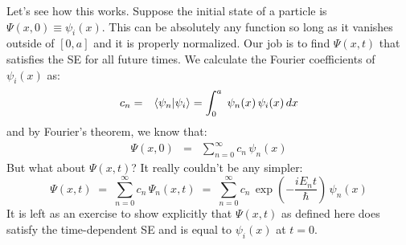 \documentclass[12pt]{book}
\begin{document}
Let's see how this works.  Suppose the initial state of a particle is $\Psi(x,0) \equiv \psi_i(x)$.  This can be absolutely any function so long as it vanishes outside of $[0,a]$ and it is properly normalized.  Our job is to find $\Psi(x,t)$ that satisfies the SE for all future times.  We calculate the Fourier coefficients of $\psi_i(x)$ as:
\begin{eqnarray*}
c_n &=& \braket{\psi_n| \psi_i} = \int_{0}^{a} \; \psi_n(x) \, \psi_i(x) \, dx \\
\end{eqnarray*}
and by Fourier's theorem, we know that:
\begin{eqnarray*}
\Psi(x,0) &=& \sum_{n=0}^{\infty} c_n \, \psi_n(x)
\end{eqnarray*}
But what about $\Psi(x,t)$?  It really couldn't be any simpler:
\begin{equation*}
\Psi(x,t) \; = \; \sum_{n=0}^{\infty} c_n \, \Psi_n(x,t) \; = \; \sum_{n=0}^{\infty} c_n \, \exp(-\frac{i E_n t}{\hbar}) \, \psi_n(x)
\end{equation*}
It is left as an exercise to show explicitly that $\Psi(x,t)$ as defined here does satisfy the time-dependent SE and is equal to $\psi_i(x)$ at $t=0$. 
\end{document}
